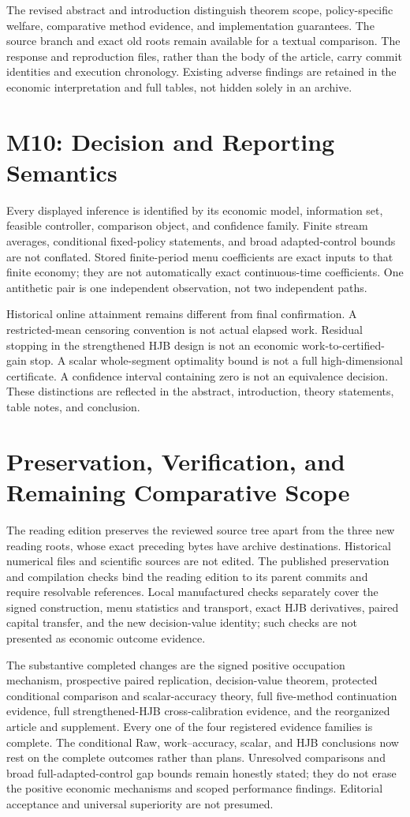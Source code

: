 The revised abstract and introduction distinguish theorem scope, policy-specific welfare, comparative method evidence, and implementation guarantees. The source branch and exact old roots remain available for a textual comparison. The response and reproduction files, rather than the body of the article, carry commit identities and execution chronology. Existing adverse findings are retained in the economic interpretation and full tables, not hidden solely in an archive.

\section{M10: Decision and Reporting Semantics}
Every displayed inference is identified by its economic model, information set, feasible controller, comparison object, and confidence family. Finite stream averages, conditional fixed-policy statements, and broad adapted-control bounds are not conflated. Stored finite-period menu coefficients are exact inputs to that finite economy; they are not automatically exact continuous-time coefficients. One antithetic pair is one independent observation, not two independent paths.

Historical online attainment remains different from final confirmation. A restricted-mean censoring convention is not actual elapsed work. Residual stopping in the strengthened HJB design is not an economic work-to-certified-gain stop. A scalar whole-segment optimality bound is not a full high-dimensional certificate. A confidence interval containing zero is not an equivalence decision. These distinctions are reflected in the abstract, introduction, theory statements, table notes, and conclusion.

\section{Preservation, Verification, and Remaining Comparative Scope}
The reading edition preserves the reviewed source tree apart from the three new reading roots, whose exact preceding bytes have archive destinations. Historical numerical files and scientific sources are not edited. The published preservation and compilation checks bind the reading edition to its parent commits and require resolvable references. Local manufactured checks separately cover the signed construction, menu statistics and transport, exact HJB derivatives, paired capital transfer, and the new decision-value identity; such checks are not presented as economic outcome evidence.

The substantive completed changes are the signed positive occupation mechanism, prospective paired replication, decision-value theorem, protected conditional comparison and scalar-accuracy theory, full five-method continuation evidence, full strengthened-HJB cross-calibration evidence, and the reorganized article and supplement. Every one of the four registered evidence families is complete. The conditional Raw, work--accuracy, scalar, and HJB conclusions now rest on the complete outcomes rather than plans. Unresolved comparisons and broad full-adapted-control gap bounds remain honestly stated; they do not erase the positive economic mechanisms and scoped performance findings. Editorial acceptance and universal superiority are not presumed.
